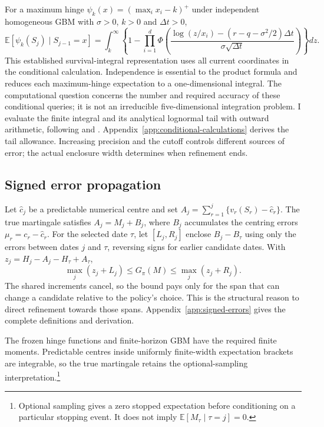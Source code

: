 \documentclass[11pt]{article}
\newcommand{\E}{\mathbb E}
\begin{document}
For a maximum hinge $\psi_k(x)=(\max_i x_i-k)^+$ under independent homogeneous GBM with $\sigma>0$, $k>0$ and $\Delta t>0$,
\begin{equation}
 \E[\psi_k(S_j)\mid S_{j-1}=x]
 =\int_k^\infty\left\{1-\prod_{i=1}^d
 \Phi\!\left(\frac{\log(z/x_i)-(r-q-\sigma^2/2)\Delta t}{\sigma\sqrt{\Delta t}}\right)\right\}dz.
\label{eq:maxintegral}
\end{equation}
This established survival-integral representation uses all current coordinates in the conditional calculation. Independence is essential to the product formula and reduces each maximum-hinge expectation to a one-dimensional integral. The computational question concerns the number and required accuracy of these conditional queries; it is not an irreducible five-dimensional integration problem. I evaluate the finite integral and its analytical lognormal tail with outward arithmetic, following \citet{johansson2017} and \citet{johansson2018}. Appendix~\ref{app:conditional-calculations} derives the tail allowance. Increasing precision and the cutoff controls different sources of error; the actual enclosure width determines when refinement ends.

\subsection{Signed error propagation}

Let $\widehat c_j$ be a predictable numerical centre and set $A_j=\sum_{r=1}^j\{v_r(S_r)-\widehat c_r\}$. The true martingale satisfies $A_j=M_j+B_j$, where $B_j$ accumulates the centring errors $\mu_r=c_r-\widehat c_r$. For the selected date $\tau$, let $[L_j,R_j]$ enclose $B_j-B_\tau$ using only the errors between dates $j$ and $\tau$, reversing signs for earlier candidate dates. With $z_j=H_j-A_j-H_\tau+A_\tau$,
\begin{equation}
 \max_j(z_j+L_j)\leq G_\pi(M)\leq\max_j(z_j+R_j).
\label{eq:signed}
\end{equation}
The shared increments cancel, so the bound pays only for the span that can change a candidate relative to the policy's choice. This is the structural reason to direct refinement towards those spans. Appendix~\ref{app:signed-errors} gives the complete definitions and derivation.

The frozen hinge functions and finite-horizon GBM have the required finite moments. Predictable centres inside uniformly finite-width expectation brackets are integrable, so the true martingale retains the optional-sampling interpretation.\footnote{Optional sampling gives a zero stopped expectation before conditioning on a particular stopping event. It does not imply $\E[M_\tau\mid\tau=j]=0$.}
\end{document}
